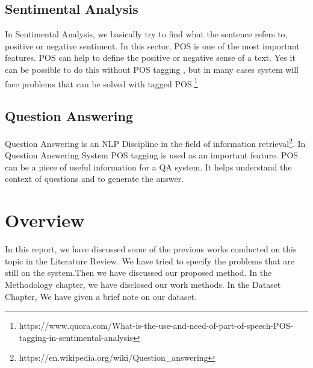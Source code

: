 \documentclass{standalone}
\begin{document}
\subsection{Sentimental Analysis}
In Sentimental Analysis, we basically try to find what the sentence refers to, positive or negative sentiment. In this sector, POS is one of the most important features. POS can help to define the positive or negative sense of a text. Yes it can be possible to do this without POS tagging , but in many cases system will face problems that can be solved with tagged POS.\footnote{https://www.quora.com/What-is-the-use-and-need-of-part-of-speech-POS-tagging-in-sentimental-analysis}
\subsection{Question Answering}
Question Answering is an NLP Discipline in the field of information retrieval\footnote{https://en.wikipedia.org/wiki/Question_answering}. In Question Answering System POS tagging is used as an important feature. POS can be a piece of useful information for a QA system. It helps understand the context of questions and to generate the answer.

\section{Overview}
In this report, we have discussed some of the previous works conducted on this topic in the Literature Review. We have tried to specify the problems that are still on the system.Then we have discussed our proposed method. In the Methodology chapter, we have disclosed our work methods. In the Dataset Chapter, We have given a brief note on our dataset.
\end{document}
